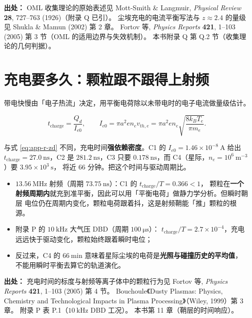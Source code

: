 {\footnotesize
\textbf{出处：} OML 收集理论的原始表述见 Mott-Smith \& Langmuir, \emph{Physical Review}
\textbf{28}, 727--763 (1926)（附录 Q 已引）。
尘埃充电的电流平衡写法与 $z\approx2.4$ 的量级见
Shukla \& Mamun (2002) 第 2 章。
Fortov 等, \emph{Physics Reports} \textbf{421}, 1--103 (2005)
第 3 节（OML 的适用边界与失效机制）。
本书附录 Q 第 Q.2 节（收集理论的几何判据）。
}

\section{充电要多久：颗粒跟不跟得上射频}
\label{sec:app-r-time}

带电快慢由「电子热流」决定，用平衡电荷除以未带电时的电子电流做量级估计。

\begin{equation}
  t_{\mathrm{charge}} = \frac{Q_d}{I_{e0}},
  \qquad
  I_{e0} = \pi a^2 e n_e v_{th,e}
  = \pi a^2 e n_e\sqrt{\frac{8k_{\!B}T_e}{\pi m_e}}.
  \label{eq:app-r-tcharge}
\end{equation}

与式 \eqref{eq:app-r-zd} 不同，充电时间\textbf{强依赖密度}。C1 的 $I_{e0}=1.46\times10^{-8}\ \mathrm{A}$
给出 $t_{\mathrm{charge}}=27.0\ \mathrm{ns}$，C2 是 $281.2\ \mathrm{ns}$，C3 只要
$0.178\ \mathrm{ns}$，而 C4（星际，$n_e=10^{6}\ \mathrm{m^{-3}}$）要 $3.95\times10^{3}\ \mathrm{s}$，
将近 $66$ 分钟。把这个时间与驱动周期比。

\begin{itemize}
  \item $13.56\ \mathrm{MHz}$ 射频（周期 $73.75\ \mathrm{ns}$）：C1 的 $t_{\mathrm{charge}}/T=0.366<1$，
        颗粒在\textbf{一个射频周期内}就充到准平衡，因此可以用「平衡电荷」做静力学分析。但瞬时鞘层
        电位仍在周期内变化，颗粒电荷跟着抖，这是射频鞘能「推」颗粒的根源。
  \item 附录 P 的 $10\ \mathrm{kHz}$ 大气压 DBD（周期 $100\ \mathrm{\mu s}$）：
        $t_{\mathrm{charge}}/T=2.7\times10^{-4}$，充电远远快于驱动变化，颗粒始终跟着瞬时电位；
  \item 反过来，C4 的 $66\ \mathrm{min}$ 意味着星际尘埃的电荷是\textbf{光照与碰撞历史的平均值}，
        不能用瞬时平衡去算它的轨道演化。
\end{itemize}

{\footnotesize
\textbf{出处：} 充电时间的标度与射频等离子体中的颗粒行为见 Fortov 等, \emph{Physics Reports}
\textbf{421}, 1--103 (2005) 第 4 节。
Bouchoule《Dusty Plasmas: Physics, Chemistry and
Technological Impacts in Plasma Processing》（Wiley, 1999）第 3 章。
附录 P 表 P.1（$10\ \mathrm{kHz}$
DBD 工况）。
本书第 11 章（鞘层的时间响应）。
}

